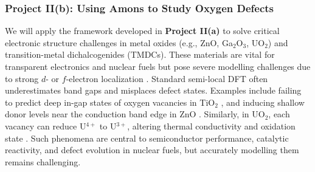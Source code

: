 \documentclass[11pt,letterpaper]{article}
\begin{document}


\subsubsection*{Project II(b): Using Amons to Study Oxygen Defects}  

We will apply the framework developed in \textbf{Project II(a)} to solve critical electronic structure challenges in metal oxides (e.g., ZnO, Ga$_2$O$_3$, UO$_2$) and transition-metal dichalcogenides (TMDCs). These materials are vital for transparent electronics and nuclear fuels but pose severe modelling challenges due to strong $d$- or $f$-electron localization \cite{localized2011defect}. Standard semi-local DFT often underestimates band gaps and misplaces defect states. Examples include failing to predict deep in-gap states of oxygen vacancies in TiO$_2$ \cite{bharti2016formation}, and inducing shallow donor levels near the conduction band edge in ZnO \cite{KIM20121711}. Similarly, in UO$_2$, each vacancy can reduce U$^{4+}$ to U$^{3+}$, altering thermal conductivity and oxidation state \cite{dorado2012first}. Such phenomena are central to semiconductor performance, catalytic reactivity, and defect evolution in nuclear fuels, but accurately modelling them remains challenging.
 
\end{document}
